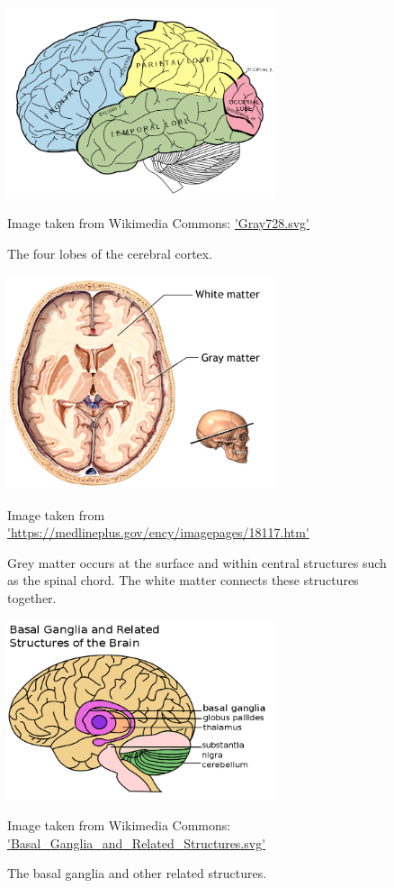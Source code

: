 \begin{figure}[ht]
	\centering
	\includegraphics[width=0.7\textwidth]{Images/2_Lobes_of_the_brain_NL.png}
	\caption{The four lobes of the cerebral cortex.}
	\small Image taken from Wikimedia Commons: \url{'Gray728.svg'}
	\label{svd-cerebrumfig}
\end{figure}

\begin{figure}[ht]
	\centering
	\includegraphics[width=0.7\textwidth]{Images/2_white_vs_grey.png}
	\caption{Grey matter occurs at the surface and within central structures such as the spinal chord. The white matter connects these structures together.}
	\small Image taken from \url{'https://medlineplus.gov/ency/imagepages/18117.htm'}
	\label{svd-greywhitefig}
\end{figure}


\begin{figure}[ht]
	\centering
	\includegraphics[width=0.7\textwidth]{Images/2_Basal_Ganglia_and_Related_Structures.png}
	\caption{The basal ganglia and other related structures.}
	\small Image taken from Wikimedia Commons: \url{'Basal_Ganglia_and_Related_Structures.svg'}
	\label{svd-basalfig}
\end{figure}


